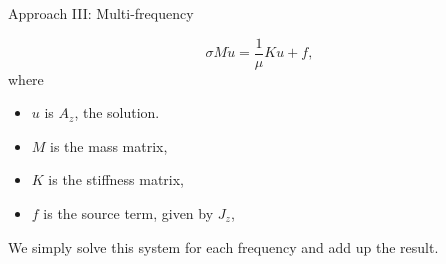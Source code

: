 \documentclass[aspectratio=43]{beamer}
\begin{document}





\begin{frame}[fragile]{Approach III: Multi-frequency} %
\begin{discretization}
    \begin{equation*}
        \sigma M \dot u = \frac{1}{\mu}K u + f,
    \end{equation*}
    where
    \begin{itemize}
        \item $u$ is $A_z$, the solution.
        \item $M$ is the mass matrix,
        \item $K$ is the stiffness matrix,
        \item $f$ is the source term, given by $J_z$,
    \end{itemize}
\end{discretization}
We simply solve this system for each frequency and add up the result. 
\end{frame}
\end{document}
